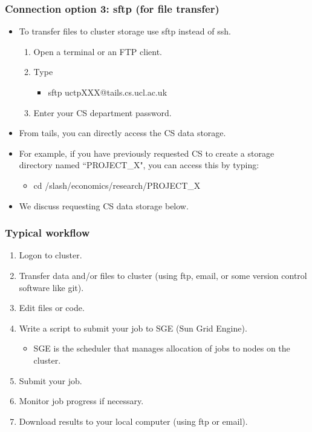 \documentclass{beamer}
\begin{document}
\begin{frame}
\frametitle{Connection option 3: sftp (for file transfer)}
\begin{itemize}
\item To transfer files to cluster storage use sftp instead of ssh.
\begin{enumerate}
\item Open a terminal or an FTP client.
\item Type
\begin{itemize}
\item sftp uctpXXX@tails.cs.ucl.ac.uk
\end{itemize}
\item Enter your CS department password.
\end{enumerate}
\item From tails, you can directly access the CS data storage. 
\item For example, if you have previously  requested CS to 
create a storage directory named ``PROJECT\_X", you can access this by typing:
\begin{itemize}
\item cd /slash/economics/research/PROJECT\_X
\end{itemize}
\item We discuss requesting CS data storage below.
\end{itemize}
\end{frame}

\begin{frame}
\frametitle{Typical workflow}
\begin{enumerate}
\item Logon to cluster.
\item Transfer data and/or files to cluster (using ftp, email, or some version control software like git).
\item Edit files or code.
\item Write a script to submit your job to SGE (Sun Grid Engine).
\begin{itemize}
\item SGE is the scheduler that manages allocation of jobs to nodes on the cluster.
\end{itemize}
\item Submit your job.
\item Monitor job progress if necessary. 
\item Download results to your local computer (using ftp or email).
\end{enumerate}

\end{frame}
\end{document}
